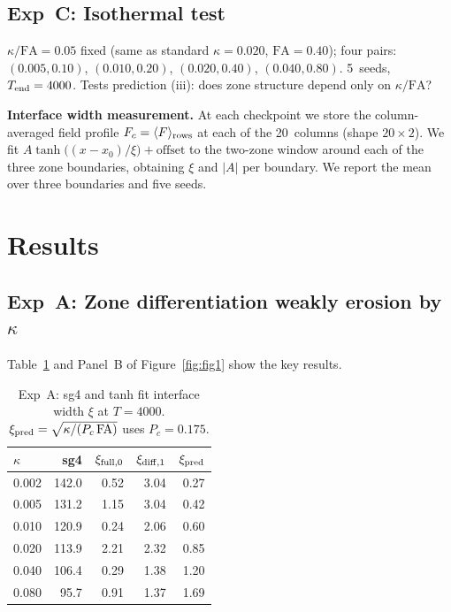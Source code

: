 \documentclass[11pt,a4paper]{article}
\begin{document}
\subsection*{Exp~C: Isothermal test}
$\kappa/\mathrm{FA}=0.05$ fixed (same as standard $\kappa=0.020$,
$\mathrm{FA}=0.40$); four pairs:
$(0.005, 0.10)$, $(0.010, 0.20)$, $(0.020, 0.40)$, $(0.040, 0.80)$.
5~seeds, $T_{\rm end}=4000$.
Tests prediction (iii): does zone structure depend only on $\kappa/\mathrm{FA}$?

\textbf{Interface width measurement.}
At each checkpoint we store the column-averaged field profile
$F_c = \langle F \rangle_{\rm rows}$ at each of the 20~columns (shape $20\times2$).
We fit $A\tanh\bigl((x-x_0)/\xi\bigr) + \text{offset}$ to the two-zone
window around each of the three zone boundaries, obtaining $\xi$ and $|A|$
per boundary.  We report the mean over three boundaries and five seeds.

\section{Results}

\subsection{Exp~A: Zone differentiation weakly erosion by $\kappa$}

Table~\ref{tab:expa} and Panel~B of Figure~\ref{fig:fig1} show the key results.

\begin{table}[h]
\centering
\small
\caption{Exp~A: sg4 and tanh fit interface width $\xi$ at $T=4000$.
         $\xi_{\rm pred}=\sqrt{\kappa/(P_c\,\mathrm{FA})}$ uses $P_c=0.175$.}
\label{tab:expa}
\begin{tabular}{lrrrr}
\toprule
$\kappa$ & sg4 & $\xi_{\rm full,0}$ & $\xi_{\rm diff,1}$ & $\xi_{\rm pred}$ \\
\midrule
0.002 & 142.0 & 0.52 & 3.04 & 0.27 \\
0.005 & 131.2 & 1.15 & 3.04 & 0.42 \\
0.010 & 120.9 & 0.24 & 2.06 & 0.60 \\
0.020 & 113.9 & 2.21 & 2.32 & 0.85 \\
0.040 & 106.4 & 0.29 & 1.38 & 1.20 \\
0.080 &  95.7 & 0.91 & 1.37 & 1.69 \\
\bottomrule
\end{tabular}
\end{table}
\end{document}
